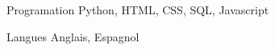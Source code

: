 

\begin{cvskills}

  \cvskill
    {Programation} %
    {Python, HTML, CSS, SQL, Javascript} %

  \cvskill
    {Langues} %
    {Anglais, Espagnol} %

\end{cvskills}
